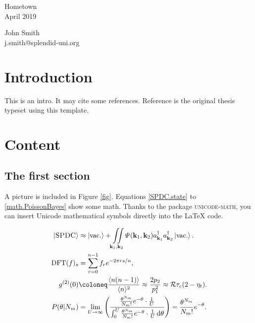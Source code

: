 \documentclass[a4paper,12pt,twoside]{report}
\begin{document}
\lipsum[1-4]

\lipsum[6-8]

\vspace{1cm}

\noindent
\parbox{.4\textwidth}{
Hometown
\\
April 2019
}
\hfill
\parbox{.4\textwidth}{\flushright
John Smith
\\
j.smith@splendid-uni.org
}

\clearpage
\pagestyle{empty}
\cleardoublepage

\pagestyle{fancy}


\chapter{Introduction}
\label{chapter.intro}

This is an intro.\autocite{Smith2017} It may cite some references.\autocite{Migdall2013Book,Straka2014,Straka2018Apr,Straka2019Thesis} Reference  is the original thesis typeset using this template.

\lipsum[1-4]

\lipsum[6-9]

\lipsum[11-12]

\chapter{Content}

\section{The first section}

A picture is included in Figure \ref{fig}. Equations \eqref{SPDC.state} to \eqref{math.PoissonBayes} show some math. Thanks to the package \textsc{unicode-math}, you can insert Unicode mathematical symbols directly into the \LaTeX{} code.

\begin{align}\label{SPDC.state}
\left| \text{\sc SPDC} \right> &\approx \left| \text{vac.} \right> + \iint\limits_{\mathbf{k}_1,\mathbf{k}_2} \varPsi(\mathbf{k}_1,\mathbf{k}_2)a^\dagger_{\mathbf{k}_1}a^\dagger_{\mathbf{k}_2} \left|\text{vac.} \right>.
\\
\text{DFT}(f)_s &= \sum_{r=0}^{n-1} f_r e^{-2\pi r s/n},
\\
g^{(2)}(0) &\coloneq \frac{\langle n(n-1) \rangle}{\langle n \rangle^2} \approx \frac{2 p_2}{p_1^2} \approx \mathcal{R}\tau_c (2-\eta_t).
\\
\label{math.PoissonBayes}
P(\theta|N_m) &= \lim_{U \rightarrow \infty} \left( \frac{\frac{\theta^{N_m}}{N_m!} e^{-\theta} \cdot \frac{1}{U}}{\int_0^U \frac{\theta^{N_m}}{N_m!} e^{-\theta} \cdot \frac{1}{U}\,\text{d}\theta} \right) = \frac{\theta^{N_m}}{N_m!} e^{-\theta}.
\end{align}
\end{document}
